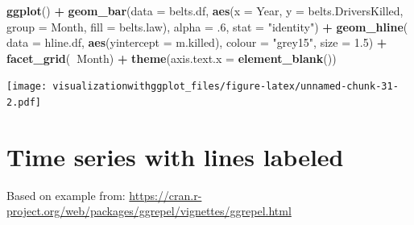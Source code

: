 \documentclass[]{krantz}
\makeatletter
\newenvironment{Shaded}{\begin{snugshade}}{\end{snugshade}}
\newcommand{\KeywordTok}[1]{\textcolor[rgb]{0.13,0.29,0.53}{\textbf{#1}}}
\newcommand{\DataTypeTok}[1]{\textcolor[rgb]{0.13,0.29,0.53}{#1}}
\newcommand{\DecValTok}[1]{\textcolor[rgb]{0.00,0.00,0.81}{#1}}
\newcommand{\FloatTok}[1]{\textcolor[rgb]{0.00,0.00,0.81}{#1}}
\newcommand{\StringTok}[1]{\textcolor[rgb]{0.31,0.60,0.02}{#1}}
\newcommand{\OperatorTok}[1]{\textcolor[rgb]{0.81,0.36,0.00}{\textbf{#1}}}
\newcommand{\NormalTok}[1]{#1}
\newenvironment{kframe}{%
\medskip{}
\setlength{\fboxsep}{.8em}
 \def\at@end@of@kframe{}%
 \ifinner\ifhmode%
  \def\at@end@of@kframe{\end{minipage}}%
  \begin{minipage}{\columnwidth}%
 \fi\fi%
 \def\FrameCommand##1{\hskip\@totalleftmargin \hskip-\fboxsep
 \colorbox{shadecolor}{##1}\hskip-\fboxsep
     \hskip-\linewidth \hskip-\@totalleftmargin \hskip\columnwidth}%
 \MakeFramed {\advance\hsize-\width
   \@totalleftmargin\z@ \linewidth\hsize
   \@setminipage}}%
 {\par\unskip\endMakeFramed%
 \at@end@of@kframe}
\renewenvironment{Shaded}{\begin{kframe}}{\end{kframe}}
\theoremstyle{definition}
\theoremstyle{definition}
\theoremstyle{definition}
\theoremstyle{remark}
\makeatother
\begin{document}
\begin{Shaded}
\begin{Highlighting}[]
\KeywordTok{ggplot}\NormalTok{() }\OperatorTok{+}
\StringTok{  }\KeywordTok{geom_bar}\NormalTok{(}\DataTypeTok{data =}\NormalTok{ belts.df, }\KeywordTok{aes}\NormalTok{(}\DataTypeTok{x =}\NormalTok{ Year, }\DataTypeTok{y =}\NormalTok{ belts.DriversKilled, }\DataTypeTok{group =}\NormalTok{ Month, }\DataTypeTok{fill =}\NormalTok{ belts.law), }\DataTypeTok{alpha =}\NormalTok{ .}\DecValTok{6}\NormalTok{, }
    \DataTypeTok{stat =} \StringTok{"identity"}\NormalTok{) }\OperatorTok{+}
\StringTok{  }\KeywordTok{geom_hline}\NormalTok{( }\DataTypeTok{data =}\NormalTok{ hline.df, }\KeywordTok{aes}\NormalTok{(}\DataTypeTok{yintercept =}\NormalTok{ m.killed), }\DataTypeTok{colour =} \StringTok{"grey15"}\NormalTok{, }\DataTypeTok{size =} \FloatTok{1.5}\NormalTok{) }\OperatorTok{+}
\StringTok{  }\KeywordTok{facet_grid}\NormalTok{(}\OperatorTok{~}\NormalTok{Month) }\OperatorTok{+}
\StringTok{  }\KeywordTok{theme}\NormalTok{(}\DataTypeTok{axis.text.x =} \KeywordTok{element_blank}\NormalTok{())}
\end{Highlighting}
\end{Shaded}

\texttt{[image: visualizationwithggplot\_files/figure-latex/unnamed-chunk-31-2.pdf]}

\section{Time series with lines
labeled}\label{time-series-with-lines-labeled}

Based on example from:
\url{https://cran.r-project.org/web/packages/ggrepel/vignettes/ggrepel.html}
\end{document}
